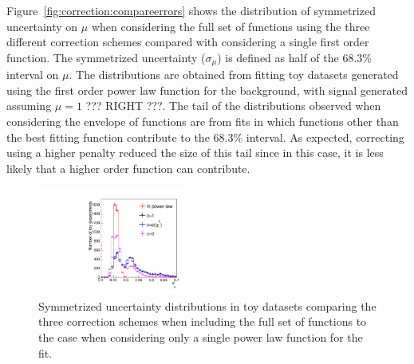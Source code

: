Figure~\ref{fig:correction:compareerrors} shows the distribution of symmetrized uncertainty on $\mu$ 
when considering the full set of functions using the three different correction schemes compared  
with considering a single first order function. The symmetrized uncertainty ($\sigma_{\mu}$) 
is defined as half of the 68.3\% interval on $\mu$. 
The distributions are obtained from fitting 
toy datasets generated using the first order power law function for the background, with 
signal generated assuming $\mu=1$ ??? RIGHT ???. The tail of the distributions observed 
when considering the envelope of functions are from fits in which functions other than the 
best fitting function contribute to the 68.3\% interval. As expected, correcting using a higher 
penalty reduced the size of this tail since in this case, it is less likely that a higher order 
function can contribute.
 
\begin{figure}[tbp]
\centering
\includegraphics[width=0.45\textwidth]{correction/compare_error_magnitude.pdf}
\caption{Symmetrized uncertainty distributions in toy datasets comparing the three correction schemes 
when including the full set of functions 
to the case when considering only a single power law function for the fit.}
\label{fig:correction:allorderbias}
\end{figure}



